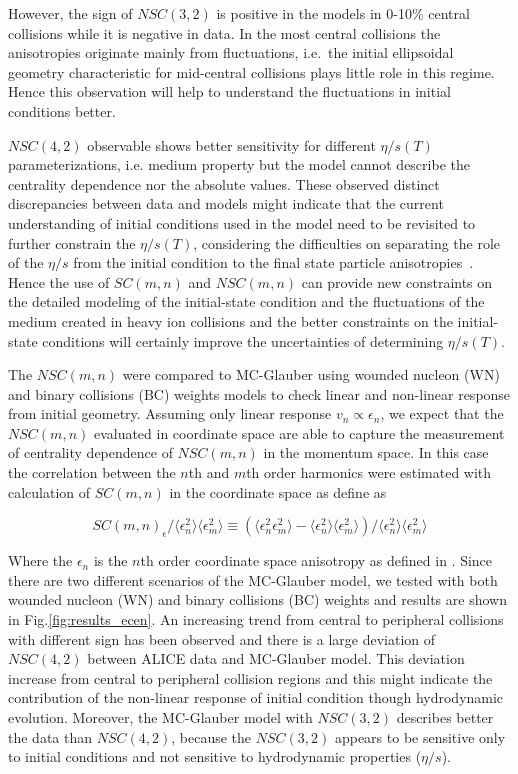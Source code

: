 However, the sign of $NSC(3,2)$ is positive in the models in 0-10\% central collisions while it is negative in data.
In the most central collisions the anisotropies originate mainly from fluctuations, i.e.\ the initial ellipsoidal geometry characteristic for mid-central collisions plays little role in this regime. Hence this observation will help to understand the fluctuations in initial conditions better.

$NSC(4,2)$ observable shows better sensitivity for different $\eta/s(T)$ parameterizations, i.e. medium property but the model cannot describe the centrality dependence nor the absolute values. These observed distinct discrepancies between data and models might indicate that the current understanding of initial conditions used in the model need to be revisited
to further constrain the $\eta/s(T)$, considering the difficulties on separating the role of the $\eta/s$  from the initial condition to the final state particle anisotropies~\cite{Romatschke:2007mq,Shen:2011zc}.
Hence the use of $SC(m,n)$ and $NSC(m,n)$ can provide new constraints on the detailed modeling of the initial-state condition and the fluctuations of the medium created in heavy ion collisions and the better constraints on the initial-state conditions will certainly improve the uncertainties of determining $\eta/s(T)$.



 The  $NSC(m,n)$ were compared to MC-Glauber using wounded nucleon (WN) and binary collisions (BC) weights models to check linear and non-linear response from initial geometry.  Assuming only linear response $v_n \propto \epsilon_n$, we expect that the  $NSC(m,n)$ evaluated in coordinate space are able to capture the measurement of centrality dependence of  $NSC(m,n)$ in the momentum space. In this case the correlation between the $n$th and $m$th order harmonics were estimated with calculation of $SC(m,n)$ in the coordinate space as define as 
 
 \begin{equation}
SC(m,n)_{\epsilon}/\langle \epsilon_n^2 \rangle \langle \epsilon_m^2 \rangle  \equiv (\langle \epsilon_n^2 \epsilon_m^2 \rangle - \langle \epsilon_n^2 \rangle \langle \epsilon_m^2 \rangle) /  \langle \epsilon_n^2 \rangle \langle \epsilon_m^2 \rangle
\label{eq:sc_ecen}
\end{equation}

Where the $\epsilon_n$ is the $n$th order coordinate space anisotropy as defined in \cite{Alver:2010gr}. Since there are two different scenarios of the MC-Glauber model, we tested with both wounded nucleon (WN) and binary collisions (BC) weights and results are shown in Fig.\ref{fig:results_ecen}. An increasing trend from central to peripheral collisions with different sign has been observed and there is a large deviation of $NSC(4,2)$ between ALICE data and MC-Glauber model. This deviation increase from central to peripheral collision regions and this might indicate the contribution of the non-linear response of initial condition though hydrodynamic evolution. Moreover, the MC-Glauber model with  $NSC(3,2)$ describes better the data  than $NSC(4,2)$,  because the  $NSC(3,2)$ appears to be sensitive only to initial conditions and not sensitive to hydrodynamic properties ($\eta/s$). 


